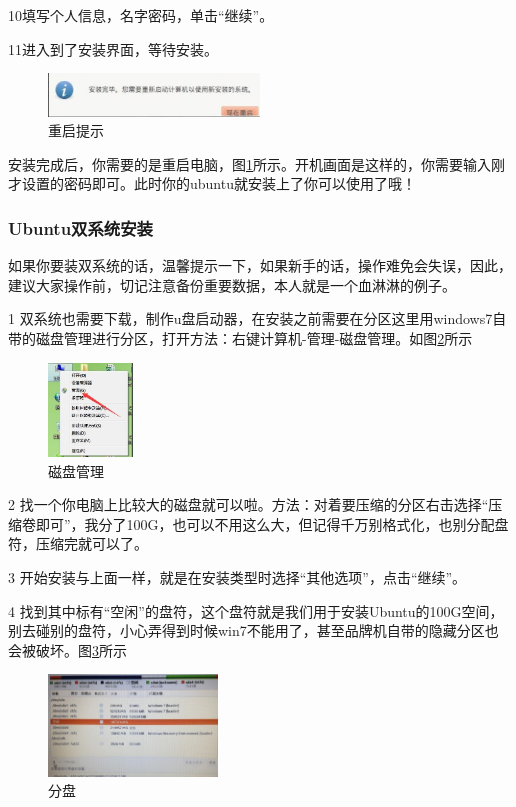 \documentclass{article}
\begin{document}
  10填写个人信息，名字密码，单击“继续”。

  11进入到了安装界面，等待安装。

\begin{figure}[!htb] %
\centering
\includegraphics[width=0.5\textwidth]{tu14.jpeg}
\caption{\small 重启提示}
\label{tu14}
\end{figure} 

安装完成后，你需要的是重启电脑，图\ref{tu14}所示。开机画面是这样的，你需要输入刚才设置的密码即可。此时你的ubuntu就安装上了你可以使用了哦！

\subsubsection{Ubuntu双系统安装}

如果你要装双系统的话，{\color{red}温馨提示一下}，{\color{blue}如果新手的话，操作难免会失误，因此，建议大家操作前，切记注意备份重要数据，本人就是一个血淋淋的例子}。

 1 双系统也需要下载，制作u盘启动器，在安装之前需要在分区这里用windows7自带的磁盘管理进行分区，打开方法：右键计算机-管理-磁盘管理。如图\ref{tu21}所示
\begin{figure}[!htb] %
\centering
\includegraphics[width=0.2\textwidth]{tu21.jpeg}
\caption{\small 磁盘管理}
\label{tu21}
\end{figure} 

 2 找一个你电脑上比较大的磁盘就可以啦。方法：对着要压缩的分区右击选择“压缩卷即可”，我分了100G，也可以不用这么大，但记得千万别格式化，也别分配盘符，压缩完就可以了。

 3 开始安装与上面一样，就是在安装类型时选择“其他选项”，点击“继续”。

 4 找到其中标有“空闲”的盘符，这个盘符就是我们用于安装Ubuntu的100G空间，别去碰别的盘符，小心弄得到时候win7不能用了，甚至品牌机自带的隐藏分区也会被破坏。图\ref{tu23}所示
\begin{figure}[!htb] %
\centering
\includegraphics[width=0.4\textwidth]{tu23.jpeg}
\caption{\small 分盘}
\label{tu23}
\end{figure} 
\end{document}
